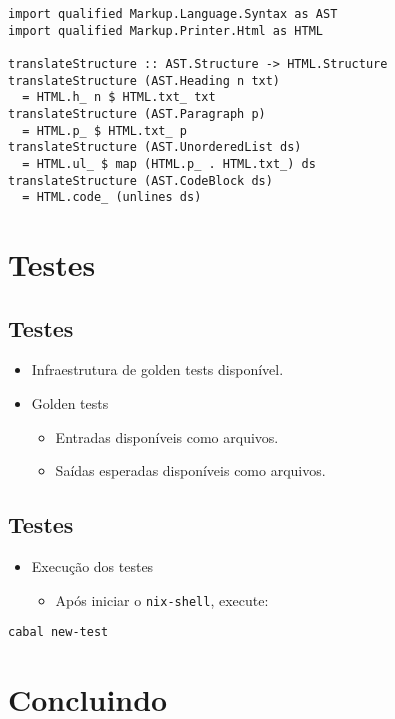 \documentclass[11pt]{article}
\begin{document}
\begin{verbatim}
import qualified Markup.Language.Syntax as AST
import qualified Markup.Printer.Html as HTML

translateStructure :: AST.Structure -> HTML.Structure
translateStructure (AST.Heading n txt)
  = HTML.h_ n $ HTML.txt_ txt
translateStructure (AST.Paragraph p)
  = HTML.p_ $ HTML.txt_ p
translateStructure (AST.UnorderedList ds)
  = HTML.ul_ $ map (HTML.p_ . HTML.txt_) ds
translateStructure (AST.CodeBlock ds)
  = HTML.code_ (unlines ds)
\end{verbatim}
\section*{Testes}
\label{sec:org1806986}

\subsection*{Testes}
\label{sec:orgc92d454}

\begin{itemize}
\item Infraestrutura de golden tests disponível.

\item Golden tests
\begin{itemize}
\item Entradas disponíveis como arquivos.
\item Saídas esperadas disponíveis como arquivos.
\end{itemize}
\end{itemize}
\subsection*{Testes}
\label{sec:orgfb200ac}

\begin{itemize}
\item Execução dos testes
\begin{itemize}
\item Após iniciar o \texttt{nix-shell}, execute:
\end{itemize}
\end{itemize}

\begin{verbatim}
cabal new-test
\end{verbatim}
\section*{Concluindo}
\label{sec:org10a49c6}
\end{document}
